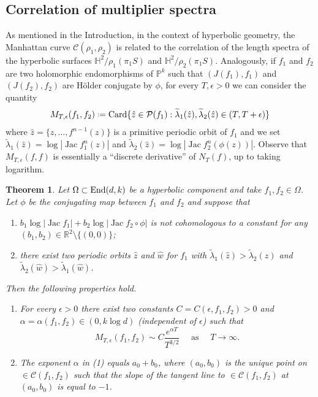 \documentclass[11pt]{amsart}
\theoremstyle{plain}
\newtheorem{thm}{Theorem}[section]
\theoremstyle{definition}
\theoremstyle{remark}
\newcommand*{\defeq}{\mathrel{\vcenter{\baselineskip0.5ex \lineskiplimit0pt
			\hbox{\scriptsize.}\hbox{\scriptsize.}}}%
	=}
\DeclareMathOperator{\Jac}{Jac}
\begin{document}
\subsection{Correlation of multiplier spectra}
As mentioned in the  Introduction, in the context of hyperbolic geometry, the Manhattan curve $\mathcal{C}(\rho_1,\rho_2)$ is related to the correlation of the length
spectra of
the hyperbolic surfaces $\mathbb{H}^2/\rho_1(\pi_1S)$ and $\mathbb{H}^2/\rho_2(\pi_1S)$. 
Analogously, if $f_1$ and $f_2$ are two holomorphic endomorphisms of $\mathbb{P}^k$ such that $(J(f_1),f_1)$ and $(J(f_2),f_2)$  are H\"older conjugate by $\phi$, 
for every $T,\epsilon>0$
we 
can consider the
quantity
$$M_{T,\epsilon}(f_1,f_2) \defeq {\rm Card}\{\hat{z} \in \mathcal{P}(f_1): \widetilde{\lambda}_1(\hat{z}),\widetilde{\lambda}_2(\hat{z}) \in (T,T+\epsilon) \}$$
where $\hat{z} = \{z,\ldots, f^{n-1}(z) \}$ is a primitive periodic orbit of $f_1$
and we set
$\widetilde{\lambda}_1(\hat{z})=\log|\Jac f_1^n(z)|$ and $\widetilde{\lambda}_2(\hat{z})=\log|\Jac f_2^n(\phi(z))|$.
Observe that $M_{T,\epsilon}(f,f)$ is essentially
a  ``discrete derivative'' of $N_T(f)$, up to taking logarithm.

\begin{thm}\label{thm_correlation_num}
Let $\Omega \subset  {\rm End}(d,k)$ be a hyperbolic component and 
take $f_1,f_2 \in \Omega$.
Let $\phi$ be the conjugating map
between $f_1$ and $f_2$
and suppose that
\begin{enumerate} [label=(\alph*)]
\item $b_1\log |\Jac f_1|+b_2\log |\Jac f_2  \circ \phi|$
is not cohomologous to a constant for any $(b_1,b_2) \in \mathbb{R}^2 \setminus \{(0,0)\}$;
\item there exist two periodic orbits $\hat z$ and $\hat w$
for $f_1$
with
$\tilde \lambda_1  (\hat z) > 
\tilde \lambda_2  (\hat z)$ and
$\tilde \lambda_2  (\hat w) > 
\tilde \lambda_1  (\hat w)$.
\end{enumerate}
Then the following properties hold.
\begin{enumerate}
\item For every
$\epsilon>0$
there exist two constants
$C = C(\epsilon,f_1,f_2)>0$ 
and $\alpha = \alpha(f_1,f_2) \in (0,k\log d)$
(independent of $\epsilon$)
such that
$$
M_{T,\epsilon} (f_1, f_2)
\sim C \frac{e^{\alpha T}}{T^{3/2}}
\quad \text{ as }
\quad T \to \infty.$$
\item The exponent $\alpha$ in (1) equals $a_0+b_0$, where $(a_0,b_0)$
 is the unique point on 
$\in \mathcal{C}(f_1,f_2)$
such that the slope of the tangent line
to $\in \mathcal{C}(f_1,f_2)$
at $(a_0,b_0)$ is equal to $-1$. 
\end{enumerate}
\end{thm}
\end{document}
